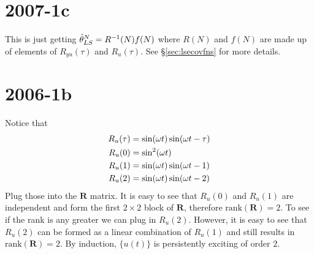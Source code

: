 \section{2007-1c}
This is just getting $\hat{\theta}_{LS}^N=R^{-1}(N)f(N)$ where $R(N)$ and $f(N)$ are made up of elements of $R_{yu}(\tau)$ and $R_u(\tau)$. See \S\ref{sec:lsecovfns} for more details.

\section{2006-1b}
Notice that
\begin{align*}
R_u(\tau) &= \sin(\omega t)\sin(\omega t-\tau) \\
R_u(0) &= \sin^2(\omega t) \\
R_u(1) &= \sin(\omega t)\sin(\omega t-1) \\
R_u(2) &= \sin(\omega t)\sin(\omega t-2)
\end{align*}
Plug those into the $\mathbf{R}$ matrix. It is easy to see that $R_u(0)$ and $R_u(1)$ are independent and form the first $2\times 2$ block of $\mathbf{R}$, therefore $\text{rank}(\mathbf{R})=2$. To see if the rank is any greater we can plug in $R_u(2)$. However, it is easy to see that $R_u(2)$ can be formed as a linear combination of $R_u(1)$ and still results in $\text{rank}(\mathbf{R})=2$. By induction, $\{u(t)\}$ is persistently exciting of order $2$.

